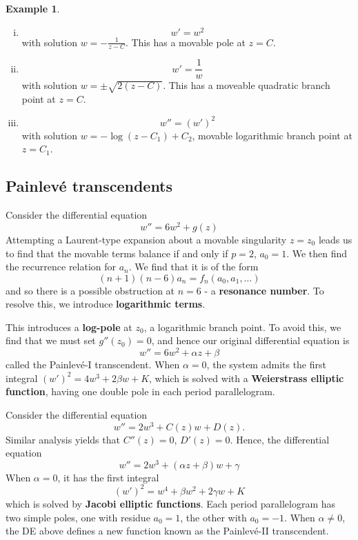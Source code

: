 \documentclass[10pt, oneside, reqno]{amsart}
\theoremstyle{plain}%
\theoremstyle{definition}
\newtheorem{exmp}[thm]{Example}
\theoremstyle{remark}
\begin{document}
\begin{exmp}
	\begin{enumerate}[(i)]
		\item \[
			w' = w^2
		\] with solution $w = -\frac{1}{z - C}$.  This has a movable pole at $z = C$. 
	
	\item \[
		w' = \frac{1}{w}
	\] with solution $w = \pm \sqrt{2(z-C)}$.  This has a moveable quadratic branch point at $z = C$.
	
	
	\item \[
		w'' = \left(w'\right)^2
	\] with solution $w = -\log (z - C_1) + C_2$, movable logarithmic branch point at $z = C_1$.

	
	\end{enumerate}
	
\end{exmp}

\subsection{Painlev\'e transcendents} %
\label{sec:painlev'e_transcendents}


Consider the differential equation \[
	w'' = 6 w^2 + g(z)
\]
Attempting a Laurent-type expansion about a movable singularity $z = z_0$ leads us to find that the movable terms balance if and only if $p = 2$, $a_0 = 1$.  We then find the recurrence relation for $a_n$.  We find that it is of the form \[
	(n+1)(n-6) a_n = f_n(a_0, a_1, \dots)
\] and so there is a possible obstruction at $n = 6$ - a \textbf{resonance number}.  To resolve this, we introduce \textbf{logarithmic terms}.  

This introduces a \textbf{log-pole} at $z_0$, a logarithmic branch point.  To avoid this, we find that we must set $g''(z_0) = 0$, and hence our original differential equation is \[
	w'' = 6 w^2 + \alpha z + \beta
\] called the Painlev\'e-I transcendent.  When $\alpha = 0$, the system admits the first integral $(w')^2 = 4w^3 + 2 \beta w + K$, which is solved with a \textbf{Weierstrass elliptic function}, having one double pole in each period parallelogram. 

Consider the differential equation \[
	w'' = 2w^3 + C(z) w + D(z).
\]
Similar analysis yields that $C''(z) = 0$, $D'(z) = 0$.  Hence, the differential equation \[
	w'' = 2w^3 + (\alpha z + \beta)w + \gamma
\]  When $\alpha = 0$, it has the first integral \[
	(w')^2 = w^4 + \beta w^2 + 2 \gamma w + K
\] which is solved by \textbf{Jacobi elliptic functions}.  Each period parallelogram has two simple poles, one with residue $a_0 = 1$, the other with $a_0 =  -1$.  When $\alpha \neq 0$, the DE above defines a new function known as the Painlev\'e-II transcendent.
\end{document}
